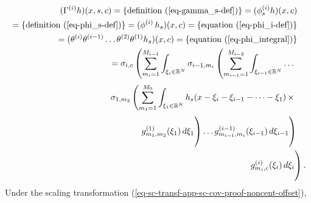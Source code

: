 \documentclass[twocolumn,runningheads]{svjour3}
\def\bbbr{{\mathbb R}}
\begin{document}
 \begin{align}
 \begin{split}
 &  (\Gamma^{(i)} h)(x, s, c)  =  \{ \mbox{definition (\ref{eq-gamma_s-def})}  \}  
 = (\phi_s^{(i)} h)(x, c) 
 \end{split}\nonumber\\
 \begin{split}
 & = \{ \mbox{definition (\ref{eq-phi_s-def})} \} 
  = (\phi^{(i)} \, h_s)(x, c) 
 = \{ \mbox{equation~(\ref{eq-phi_i-def})} \}
 \end{split}\nonumber\\
 \begin{split}
 & = (\theta^{(i)} \theta^{(i-1)} \dots \theta^{(2)} \theta^{(1)}  h_s)(x, c) 
 = \{ \mbox{equation~(\ref{eq-phi_integral})} \}
 \end{split}\nonumber\\
 \begin{split}
 & = 
 \sigma_{i,c}
 \left(
 \sum_{m_i=1}^{M_{i-1}}
 \int_{\xi_i \in \bbbr^N} 
 \sigma_{i-1,m_i}
 \left(
 \sum_{m_{i-1}=1}^{M_{i-2}}
 \int_{\xi_{i-1} \in \bbbr^N} 
 \dots
 \right.
 \right.
 \end{split}\nonumber\\
 \begin{split}
 & \phantom{\sigma_i \vphantom{\left( \sum_{m_i=1}^{M_{i-1}} \right.)}} \quad
 \left.
 \left.
 \sigma_{1,m_2}
 \left(
 \sum_{m_1=1}^{M_0}
 \int_{\xi_1 \in \bbbr^N} 
 h_s(x - \xi_i - \xi_{i-1} -
 \dots - \xi_1) \, \times
 \right.
 \right.
 \right.
 \end{split}\nonumber\\
 \begin{split}
 & \phantom{\sigma_i \vphantom{\left( \sum_{m_i=1}^{M_{i-1}} \right.)}} \quad
 \left.
 \left.
 \left.
 \phantom{\left(\sum_{m_i=1}^{M_{i-1}} \right.)}
 g_{m_1,m_2}^{(1)}(\xi_1)  \, d\xi_1
 \right) \dots
 g_{m_{i-1},m_i}^{(i-1)}(\xi_{i-1})  \, d\xi_{i-1}
 \vphantom{\left( \sum_{m_i=1}^{M_{i-1}} \right.)} 
 \right)
 \right.
 \end{split}\nonumber\\
 \begin{split}
 \label{eq-exp-int-repr-sc-cov-proof-noncent-offset}
 \left.
 \vphantom{\left(\sum_{m_i=1}^{M_{i-1}} \right.)}\quad\quad
 g_{m_i,c}^{(i)}(\xi_i)  \, d\xi_i
 \vphantom{\left( \sum_{m_i=1}^{M_{i-1}} \right.)} \right).
 \end{split} 
 \end{align}
Under the scaling transformation
(\ref{eq-sc-transf-app-sc-cov-proof-noncent-offset}), 
\end{document}
